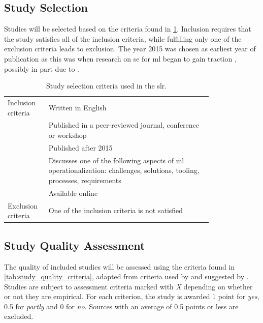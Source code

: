 \subsection{Study Selection}
Studies will be selected based on the criteria found in \cref{tab:selection_criteria}.
Inclusion requires that the study satisfies all of the inclusion criteria, while fulfilling only one of the exclusion criteria leads to exclusion.
The year 2015 was chosen as earliest year of publication as this was when research on \acrshort{se} for \acrshort{ml} began to gain traction \cite{Kumeno2020}, possibly in part due to \textcite{Sculley2015}.
\begin{table}[h]
    \centering
    \begin{tabular}{l|p{0.8\linewidth}}
    Inclusion criteria &  Written in English \\
    & Published in a peer-reviewed journal, conference or workshop \\
    & Published after 2015\\
    & Discusses one of the following aspects of \acrshort{ml} operationalization: challenges, solutions, tooling, processes, requirements \\
    & Available online\\
    \hline
    Exclusion criteria & One of the inclusion criteria is not satisfied\\
    \end{tabular}
    \caption{Study selection criteria used in the \acrshort{slr}.}
    \label{tab:selection_criteria}
\end{table}

\subsection{Study Quality Assessment}
The quality of included studies will be assessed using the criteria found in \cref{tab:study_quality_criteria}, adapted from criteria used by \cite{Giray2021} and suggested by \cite{Garousi2016}.
Studies are subject to assessment criteria marked with \emph{X} depending on whether or not they are empirical.
For each criterion, the study is awarded 1 point for \emph{yes}, 0.5 for \emph{partly} and 0 for \emph{no}.
Sources with an average of 0.5 points or less are excluded.

